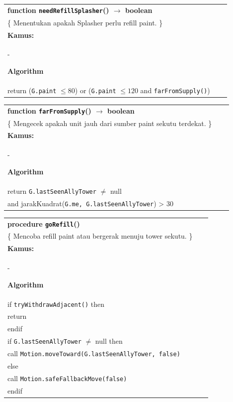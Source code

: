 \documentclass{article}
\newenvironment{pseudobox}
{
\centering
\begin{longtable}{|p{0.94\linewidth}|}
\hline
}
{
\\ \hline
\end{longtable}
\vspace{0.05cm}
}
\begin{document}
\begin{enumerate}[label=\alph*.]
\begin{enumerate}[label=\alph*.]
\begin{pseudobox}
\textbf{function \texttt{needRefillSplasher}() $\rightarrow$ boolean} \\
\{ Menentukan apakah Splasher perlu refill paint. \}\\

\textbf{Kamus:} \\
\hspace*{1.5em}-

\textbf{Algorithm} \\
\hspace*{1.5em}return (\texttt{G.paint} $\leq 80$) or (\texttt{G.paint} $\leq 120$ and \texttt{farFromSupply()})
\end{pseudobox}

\begin{pseudobox}
\textbf{function \texttt{farFromSupply}() $\rightarrow$ boolean} \\
\{ Mengecek apakah unit jauh dari sumber paint sekutu terdekat. \} \\

\textbf{Kamus:} \\
\hspace*{1.5em}-

\textbf{Algorithm} \\
\hspace*{1.5em}return \texttt{G.lastSeenAllyTower} $\neq$ null \\
\hspace*{4.5em}and jarakKuadrat(\texttt{G.me, G.lastSeenAllyTower}) > 30
\end{pseudobox}

\begin{pseudobox}
\textbf{procedure \texttt{goRefill}()} \\
\{ Mencoba refill paint atau bergerak menuju tower sekutu. \} \\

\textbf{Kamus:} \\
\hspace*{1.5em}-

\textbf{Algorithm} \\
\hspace*{1.5em}if \texttt{tryWithdrawAdjacent()} then \\
\hspace*{3em}return  \\
\hspace*{1.5em}endif \\

\hspace*{1.5em}if \texttt{G.lastSeenAllyTower} $\neq$ null then \\
\hspace*{3em}call \texttt{Motion.moveToward(G.lastSeenAllyTower, false)} \\
\hspace*{1.5em}else \\
\hspace*{3em}call \texttt{Motion.safeFallbackMove(false)} \\
\hspace*{1.5em}endif
\end{pseudobox}


\end{enumerate}
\end{enumerate}
\end{document}
